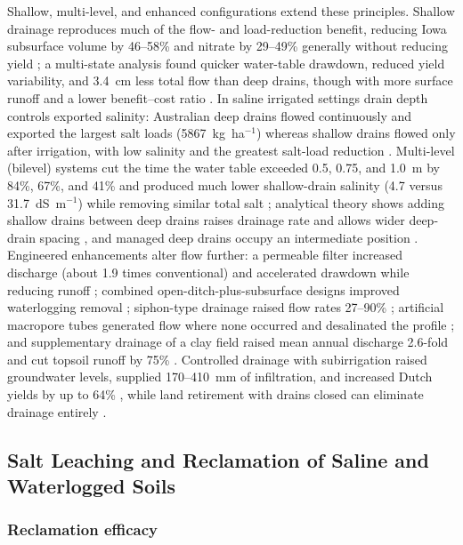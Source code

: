 Shallow, multi-level, and enhanced configurations extend these principles.
Shallow drainage reproduces much of the flow- and load-reduction benefit,
reducing Iowa subsurface volume by 46--58\% and nitrate by 29--49\% generally
without reducing yield \parencite{Helmers2012,Schott2017}; a multi-state analysis
found quicker water-table drawdown, reduced yield variability, and 3.4~cm less
total flow than deep drains, though with more surface runoff and a lower
benefit--cost ratio \parencite{Ghane2021b}. In saline irrigated settings drain
depth controls exported salinity: Australian deep drains flowed continuously and
exported the largest salt loads (5867~kg~ha$^{-1}$) whereas shallow drains flowed
only after irrigation, with low salinity and the greatest salt-load reduction
\parencite{Christen2001b}. Multi-level (bilevel) systems cut the time the water
table exceeded 0.5, 0.75, and 1.0~m by 84\%, 67\%, and 41\% and produced much
lower shallow-drain salinity (4.7 versus 31.7~dS~m$^{-1}$) while removing similar
total salt \parencite{Hornbuckle2007}; analytical theory shows adding shallow
drains between deep drains raises drainage rate and allows wider deep-drain
spacing \parencite{Hornbuckle2012}, and managed deep drains occupy an
intermediate position \parencite{Ayars2006b,Christen2001b}. Engineered
enhancements alter flow further: a permeable filter increased discharge (about
1.9 times conventional) and accelerated drawdown while reducing runoff
\parencite{Tao2016,Tao2017}; combined open-ditch-plus-subsurface designs improved
waterlogging removal \parencite{Ren2021,Tao2025}; siphon-type drainage raised
flow rates 27--90\% \parencite{Ren2023}; artificial macropore tubes generated
flow where none occurred and desalinated the profile \parencite{Chen2021}; and
supplementary drainage of a clay field raised mean annual discharge 2.6-fold and
cut topsoil runoff by 75\% \parencite{Häggblom2019}. Controlled drainage with
subirrigation raised groundwater levels, supplied 170--410~mm of infiltration,
and increased Dutch yields by up to 64\%
\parencite{deWit2022,deWit2024,FAUSEY1995,Almen2021,Madramootoo2007}, while land
retirement with drains closed can eliminate drainage entirely
\parencite{Purkey2001}.

\subsection{Salt Leaching and Reclamation of Saline and Waterlogged Soils}

\subsubsection{Reclamation efficacy}

